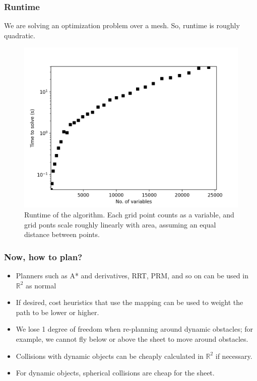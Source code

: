 \documentclass[10pt]{beamer}
\begin{document}
	\begin{frame}
		\frametitle{Runtime}
		We are solving an optimization problem over a mesh. So, runtime is roughly quadratic.
		
		\begin{figure}
			\centering
			\includegraphics[width=0.6\linewidth]{speed}
			\caption{Runtime of the algorithm. Each grid point counts as a variable, and grid ponts scale roughly linearly with area, assuming an equal distance between points.}
			\label{fig:speed}
		\end{figure}
		
		
		
	\end{frame}

	\begin{frame}
		\frametitle{Now, how to plan?}
		\begin{itemize}
			\item Planners such as A* and derivatives, RRT, PRM, and so on can be used in $\mathbb{R}^2$ as normal
			\item If desired, cost heuristics that use the mapping can be used to weight the path to be lower or higher.
			\item We lose 1 degree of freedom when re-planning around dynamic obstacles; for example, we cannot fly below or above the sheet to move around obstacles.
			\item Collisions with dynamic objects can be cheaply calculated in $\mathbb{R}^2$ if necessary.
			\item For dynamic objects, spherical collisions are cheap for the sheet.
		\end{itemize}
	\end{frame}	
	
\end{document}
